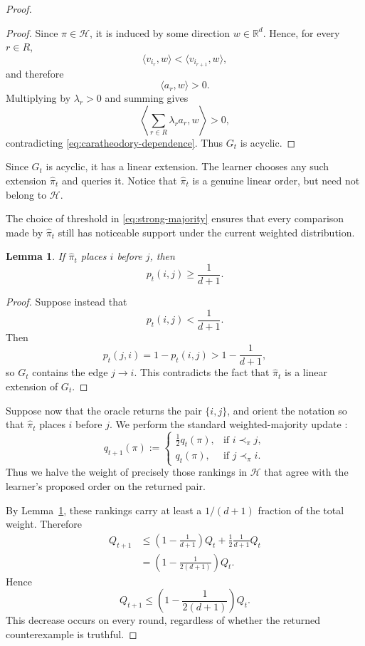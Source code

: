 \documentclass[11pt]{article}
\newtheorem{lemma}[theorem]{Lemma}
\theoremstyle{definition}
\theoremstyle{remark}
\begin{document}
\begin{proof}
\begin{proof}
Since $\pi\in\mathcal H$, it is induced by some direction
$w\in\mathbb R^d$. Hence, for every $r\in R$,
\[
    \langle v_{i_r},w\rangle
    <
    \langle v_{i_{r+1}},w\rangle,
\]
and therefore
\[
    \langle a_r,w\rangle>0.
\]
Multiplying by $\lambda_r>0$ and summing gives
\[
    \left\langle
        \sum_{r\in R}\lambda_r a_r,w
    \right\rangle
    >0,
\]
contradicting \eqref{eq:caratheodory-dependence}. Thus $G_t$ is acyclic.
\end{proof}

Since $G_t$ is acyclic, it has a linear extension. The learner chooses any
such extension $\widehat\pi_t$ and queries it. Notice that
$\widehat\pi_t$ is a genuine linear order, but need not belong to
$\mathcal H$.

The choice of threshold in \eqref{eq:strong-majority} ensures that every
comparison made by $\widehat\pi_t$ still has noticeable support under the
current weighted distribution.

\begin{lemma}
\label{lem:geometric-support}
If $\widehat\pi_t$ places $i$ before $j$, then
\[
    p_t(i,j)\geq\frac1{d+1}.
\]
\end{lemma}

\begin{proof}
Suppose instead that
\[
    p_t(i,j)<\frac1{d+1}.
\]
Then
\[
    p_t(j,i)
    =
    1-p_t(i,j)
    >
    1-\frac1{d+1},
\]
so $G_t$ contains the edge $j\to i$. This contradicts the fact that
$\widehat\pi_t$ is a linear extension of $G_t$.
\end{proof}

Suppose now that the oracle returns the pair $\{i,j\}$, and orient the
notation so that $\widehat\pi_t$ places $i$ before $j$. We perform the
standard weighted-majority update \cite{LittlestoneWarmuth1994}:
\[
    q_{t+1}(\pi)
    :=
    \begin{cases}
        \frac12 q_t(\pi),
        & \text{if }i\prec_\pi j,\\[3pt]
        q_t(\pi),
        & \text{if }j\prec_\pi i.
    \end{cases}
    \tag{17}\label{eq:geometric-weight-update}
\]
Thus we halve the weight of precisely those rankings in $\mathcal H$ that
agree with the learner's proposed order on the returned pair.

By Lemma~\ref{lem:geometric-support}, these rankings carry at least a
$1/(d+1)$ fraction of the total weight. Therefore
\begin{align*}
    Q_{t+1}
    &\leq
    \left(1-\frac1{d+1}\right)Q_t
    +
    \frac12\frac1{d+1}Q_t\\
    &=
    \left(
        1-\frac{1}{2(d+1)}
    \right)Q_t.
\end{align*}
Hence
\[
    Q_{t+1}
    \leq
    \left(
        1-\frac{1}{2(d+1)}
    \right)Q_t.
    \tag{18}\label{eq:geometric-total-weight}
\]
This decrease occurs on every round, regardless of whether the returned
counterexample is truthful.


\end{proof}
\end{document}
